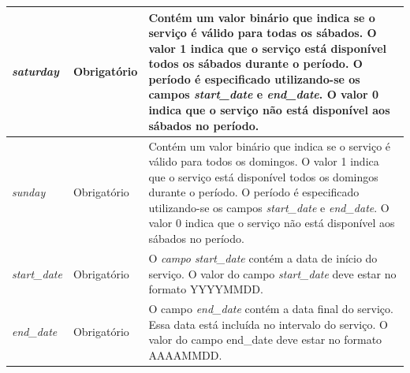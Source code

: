 \documentclass[
	12pt,				%
	oneside,			%
	a4paper,			%
	english,			%
	brazil				%
	]{abntex2ppgsi}
\begin{document}
{{\begin{apendicesenv}
\begin{longtable}[!htb]{>{\centering\arraybackslash}m{3.8cm} | >{\centering}m{2.5cm} | >{\centering\arraybackslash}m{8.5cm}}
\hline 
\textit{saturday} & Obrigatório & Contém um valor binário que indica se o serviço é válido para todas os sábados. O valor 1 indica que o serviço está disponível todos os sábados durante o período. O período é especificado utilizando-se os campos \textit{start\_date} e \textit{end\_date}. O valor 0 indica que o serviço não está disponível aos sábados no período. \\
\hline 
\textit{sunday} & Obrigatório & Contém um valor binário que indica se o serviço é válido para todos os domingos. O valor 1 indica que o serviço está disponível todos os domingos durante o período. O período é especificado utilizando-se os campos \textit{start\_date} e \textit{end\_date}. O valor 0 indica que o serviço não está disponível aos sábados no período. \\
\hline 
\textit{start\_date} & Obrigatório & O \textit{campo start\_date} contém a data de início do serviço. O valor do campo \textit{start\_date} deve estar no formato YYYYMMDD. \\
\hline 
\textit{end\_date} & Obrigatório & O campo \textit{end\_date} contém a data final do serviço. Essa data está incluída no intervalo do serviço. O valor do campo end\_date deve estar no formato AAAAMMDD. \\

\end{longtable}
\vspace{-\baselineskip}

\newpage


\end{apendicesenv}}}
\end{document}
